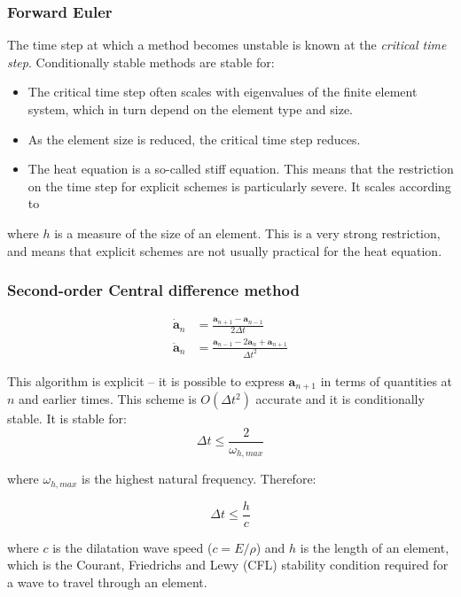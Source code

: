 \documentclass[notes]{beamer}
\begin{document}
\begin{frame}
\frametitle{Forward Euler}
The time step at which a method becomes unstable is known at the \textit{critical time
step}. Conditionally stable methods are stable for: 

\begin{itemize}
	\item The critical time step often scales with eigenvalues of the finite element system, which in turn depend on the element type and size. 
	\item As the element size is reduced, the critical time step reduces.
	\item The heat equation is a so-called stiff equation. This means that the restriction on the
	time step for explicit schemes is particularly severe. It scales according to \mode<beamer>{$\Delta t \propto h^2$}
\end{itemize}
where $h$ is a measure of the size of an element. This is a very strong restriction, and
means that explicit schemes are not usually practical for the heat equation.
\end{frame}


\begin{frame}
\frametitle{Second-order Central difference method}
\begin{align*}
	\dot{\mathbf{a}}_n & = \frac{\mathbf{a}_{n+1} - \mathbf{a}_{n-1} }{2\Delta t} \\
	\ddot{\mathbf{a}}_n & = \frac{\mathbf{a}_{n-1} -2 \mathbf{a}_n + \mathbf{a}_{n+1} }{\Delta t^2}
\end{align*}
	
This algorithm is explicit – it is possible	to express $\mathbf{a}_{n+1}$ in terms of quantities at $n$ and earlier times. This scheme is $O(\Delta t^2)$ 	accurate and it is conditionally stable. It is stable for:
	\begin{equation*}
	\Delta t \le \frac{2}{\omega_{h, max}}
	\end{equation*}
	
	where $\omega_{h, max}$ is the highest natural frequency. Therefore:
	
	\begin{equation*}
	\Delta t \le \frac{h}{c}
	\end{equation*}

where $c$ is the dilatation wave speed ($c = E/\rho$) and $h$ is the length of an element, which is the Courant, Friedrichs and Lewy (CFL) stability condition required for a wave to travel through an element.
\end{frame}
\end{document}
